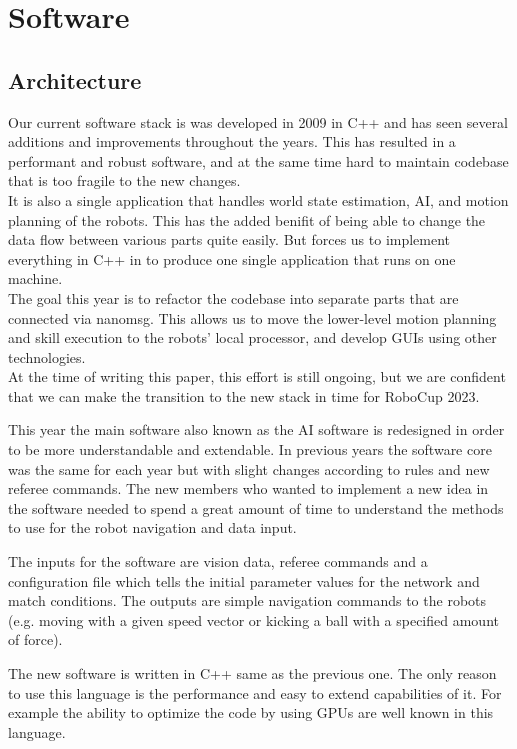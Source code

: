 \documentclass[runningheads]{llncs}
\begin{document}
\section{Software}

\subsection{Architecture}
Our current software stack is was developed in 2009 in C++ and has seen several additions and improvements throughout the years. This has resulted in a performant and robust software, and at the same time hard to maintain codebase that is too fragile to the new changes.\\
\indent It is also a single application that handles world state estimation, AI, and motion planning of the robots. This has the added benifit of being able to change the data flow between various parts quite easily. But forces us to implement everything in C++ in to produce one single application that runs on one machine.\\
\indent The goal this year is to refactor the codebase into separate parts that are connected via nanomsg. This allows us to move the lower-level motion planning and skill execution to the robots' local processor, and develop GUIs using other technologies. \\
\indent At the time of writing this paper, this effort is still ongoing, but we are confident that we can make the transition to the new stack in time for RoboCup 2023.

This year the main software also known as the AI software is redesigned in order to be more understandable and extendable. In previous years the software core was the same for each year but with slight changes according to rules and new referee commands. The new members who wanted to implement a new idea in the software needed to spend a great amount of time to understand the methods to use for the robot navigation and data input.

The inputs for the software are vision data, referee commands and a configuration file which tells the initial parameter values for the network and match conditions. The outputs are simple navigation commands to the robots (e.g. moving with a given speed vector or kicking a ball with a specified amount of force).

The new software is written in C++ same as the previous one. The only reason to use this language is the performance and easy to extend capabilities of it. For example the ability to optimize the code by using GPUs are well known in this language.
\end{document}
